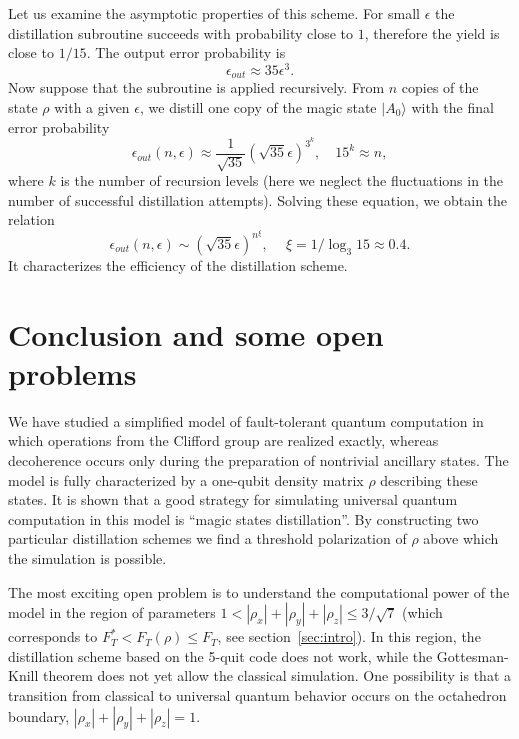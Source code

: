 \documentclass[pra,twocolumn,showpacs]{revtex4}
\newcommand{\ra}{\rangle}
\newcommand{\ep}{\epsilon}
\begin{document}
Let us examine the asymptotic properties of this scheme.  For small $\ep$ the
distillation subroutine succeeds with probability close to $1$, therefore the
yield is close to $1/15$. The output error probability is
\begin{equation}\label{35ep^3}
\ep_{out}\approx 35 \ep^3.
\end{equation}
Now suppose that the subroutine is applied recursively. From $n$ copies of the
state $\rho$ with a given $\ep$, we distill one copy of the magic state
$|A_0\ra$ with the final error probability
\[
\ep_{out}(n,\ep)\approx\frac1{\sqrt{35}}
\left( \sqrt{35}\ep\right)^{\displaystyle 3^k},\quad
15^k\approx n,
\]
where $k$ is the number of recursion levels (here we neglect the fluctuations
in the number of successful distillation attempts).  Solving these equation,
we obtain the relation
\begin{equation}\label{H-eff}
\ep_{out}(n,\ep)\sim \left( \sqrt{35} \ep\right)^{\displaystyle n^\xi},
\quad\ \xi=1/\log_{3}15\approx 0.4.
\end{equation}
It characterizes the efficiency of the distillation scheme.

\section{\label{sec:conclusion} Conclusion and some open problems}

We have studied a simplified model of fault-tolerant quantum computation in
which operations from the Clifford group are realized exactly, whereas
decoherence occurs only during the preparation of nontrivial ancillary
states. The model is fully characterized by a one-qubit density matrix $\rho$
describing these states. It is shown that a good strategy for simulating
universal quantum computation in this model is ``magic states
distillation''. By constructing two particular distillation schemes we find a
threshold polarization of $\rho$ above which the simulation is possible.

The most exciting open problem is to understand the computational power of the
model in the region of parameters $1<|\rho_x|+|\rho_y|+|\rho_z|\le 3/\sqrt{7}$
(which corresponds to $F_T^* < F_T(\rho)\le F_T$, see
section~\ref{sec:intro}). In this region, the distillation scheme based on the
5-quit code does not work, while the Gottesman-Knill theorem does not yet
allow the classical simulation. One possibility is that a transition from
classical to universal quantum behavior occurs on the octahedron boundary,
$|\rho_x|+|\rho_y|+|\rho_z|=1$.
\end{document}
